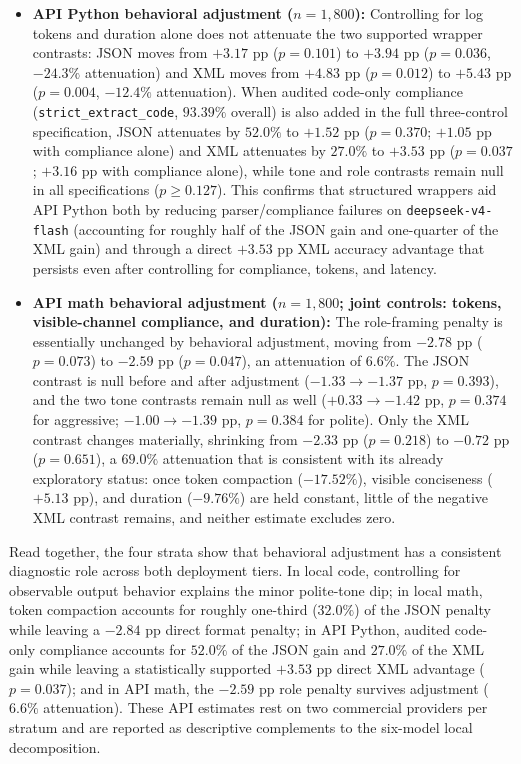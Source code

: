 \documentclass[a4paper,fleqn]{cas-sc}
\begin{document}
\begin{itemize}
\item \textbf{API Python behavioral adjustment ($n = 1{,}800$):} Controlling for log tokens and duration alone does not attenuate the two supported wrapper contrasts: JSON moves from $+3.17$ pp ($p = 0.101$) to $+3.94$ pp ($p = 0.036$, $-24.3\%$ attenuation) and XML moves from $+4.83$ pp ($p = 0.012$) to $+5.43$ pp ($p = 0.004$, $-12.4\%$ attenuation). When audited code-only compliance (\texttt{strict\_extract\_code}, $93.39\%$ overall) is also added in the full three-control specification, JSON attenuates by $52.0\%$ to $+1.52$ pp ($p = 0.370$; $+1.05$ pp with compliance alone) and XML attenuates by $27.0\%$ to $+3.53$ pp ($p = 0.037$; $+3.16$ pp with compliance alone), while tone and role contrasts remain null in all specifications ($p \ge 0.127$). This confirms that structured wrappers aid API Python both by reducing parser/compliance failures on \texttt{deepseek-v4-flash} (accounting for roughly half of the JSON gain and one-quarter of the XML gain) and through a direct $+3.53$ pp XML accuracy advantage that persists even after controlling for compliance, tokens, and latency.
\item \textbf{API math behavioral adjustment ($n = 1{,}800$; joint controls: tokens, visible-channel compliance, and duration):} The role-framing penalty is essentially unchanged by behavioral adjustment, moving from $-2.78$ pp ($p = 0.073$) to $-2.59$ pp ($p = 0.047$), an attenuation of $6.6\%$. The JSON contrast is null before and after adjustment ($-1.33 \to -1.37$ pp, $p = 0.393$), and the two tone contrasts remain null as well ($+0.33 \to -1.42$ pp, $p = 0.374$ for aggressive; $-1.00 \to -1.39$ pp, $p = 0.384$ for polite). Only the XML contrast changes materially, shrinking from $-2.33$ pp ($p = 0.218$) to $-0.72$ pp ($p = 0.651$), a $69.0\%$ attenuation that is consistent with its already exploratory status: once token compaction ($-17.52\%$), visible conciseness ($+5.13$ pp), and duration ($-9.76\%$) are held constant, little of the negative XML contrast remains, and neither estimate excludes zero.
\end{itemize}

Read together, the four strata show that behavioral adjustment has a consistent diagnostic role across both deployment tiers. In local code, controlling for observable output behavior explains the minor polite-tone dip; in local math, token compaction accounts for roughly one-third ($32.0\%$) of the JSON penalty while leaving a $-2.84$ pp direct format penalty; in API Python, audited code-only compliance accounts for $52.0\%$ of the JSON gain and $27.0\%$ of the XML gain while leaving a statistically supported $+3.53$ pp direct XML advantage ($p = 0.037$); and in API math, the $-2.59$ pp role penalty survives adjustment ($6.6\%$ attenuation). These API estimates rest on two commercial providers per stratum and are reported as descriptive complements to the six-model local decomposition.
\end{document}
